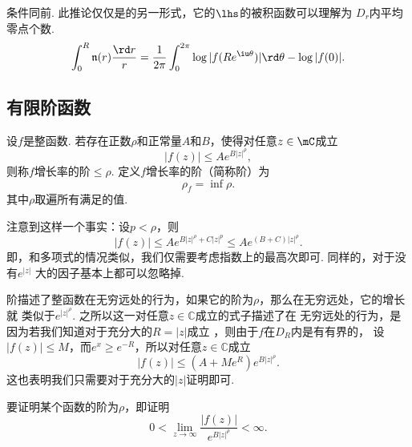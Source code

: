   \begin{cor}
    \label{cor: 整函数、零点、模}
    条件同前. 此推论仅仅是的另一形式，它的$\lhs$的被积函数可以理解为
    $D_r$内平均零点个数. 
    \[
      \int_0^R\mathfrak{n}(r)\frac{\rd r}{r} = \frac{1}{2\pi}
      \int_0^{2\pi}\log|f(Re^{\iu\theta})|\rd\theta - \log|f(0)|.
    \]
  \end{cor}


\subsection{有限阶函数}
  \begin{defi}
    \label{defi: 整函数的阶}
    设$f$是整函数. 若存在正数$\rho$和正常量$A$和$B$，使得对任意$z\in\mC$成立
    \begin{equation}
      \label{equ: 整函数的阶、小于等于}
      |f(z)| \le Ae^{B|z|^\rho},
    \end{equation}
    则称$f$增长率的阶$\le\rho$. 定义$f$增长率的阶（简称阶）为
    \[
      \rho_f = \inf\rho.
    \]
    其中$\rho$取遍所有满足的值.
  \end{defi}
  \remark
    注意到这样一个事实：设$p<\rho$，则
    \[
      |f(z)|\le Ae^{B|z|^\rho + C|z|^p} \le Ae^{(B+C)|z|^\rho}.
    \]
    即，和多项式的情况类似，我们仅需要考虑指数上的最高次即可. 同样的，对于没有$e^|z|$
    大的因子基本上都可以忽略掉.\par
    阶描述了整函数在无穷远处的行为，如果它的阶为$\rho$，那么在无穷远处，它的增长就
    类似于$e^{|z|^\rho}$. 之所以这一对任意$z\in\mathbb{C}$成立的式子描述了在
    无穷远处的行为，是因为若我们知道对于充分大的$R=|z|$成立
    ，则由于$f$在$D_R$内是有有界的，
    设$|f(z)|\le M$，而$e^x\ge e^{-R}$，所以对任意$z\in\mathbb{C}$成立
    \[
      |f(z)| \le \left(A + Me^R\right)e^{B|z|^\rho}.
    \]
    这也表明我们只需要对于充分大的$|z|$证明即可.\par
    要证明某个函数的阶为$\rho$，即证明
    \[
      0 < \lim_{z\to\infty}\frac{|f(z)|}{e^{B|z|^\rho}} < \infty.
    \]
    

